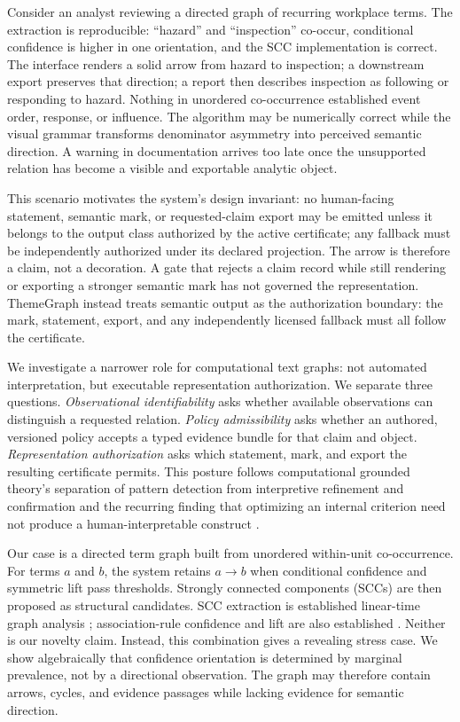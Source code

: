 \documentclass[manuscript,screen,review]{acmart}
\begin{document}
Consider an analyst reviewing a directed graph of recurring workplace terms. The extraction is reproducible: ``hazard'' and ``inspection'' co-occur, conditional confidence is higher in one orientation, and the SCC implementation is correct. The interface renders a solid arrow from hazard to inspection; a downstream export preserves that direction; a report then describes inspection as following or responding to hazard. Nothing in unordered co-occurrence established event order, response, or influence. The algorithm may be numerically correct while the visual grammar transforms denominator asymmetry into perceived semantic direction. A warning in documentation arrives too late once the unsupported relation has become a visible and exportable analytic object.

This scenario motivates the system's design invariant: no human-facing statement, semantic mark, or requested-claim export may be emitted unless it belongs to the output class authorized by the active certificate; any fallback must be independently authorized under its declared projection. The arrow is therefore a claim, not a decoration. A gate that rejects a claim record while still rendering or exporting a stronger semantic mark has not governed the representation. ThemeGraph instead treats semantic output as the authorization boundary: the mark, statement, export, and any independently licensed fallback must all follow the certificate.

We investigate a narrower role for computational text graphs: not automated interpretation, but executable representation authorization. We separate three questions. \emph{Observational identifiability} asks whether available observations can distinguish a requested relation. \emph{Policy admissibility} asks whether an authored, versioned policy accepts a typed evidence bundle for that claim and object. \emph{Representation authorization} asks which statement, mark, and export the resulting certificate permits. This posture follows computational grounded theory's separation of pattern detection from interpretive refinement and confirmation \cite{nelson2020} and the recurring finding that optimizing an internal criterion need not produce a human-interpretable construct \cite{chang2009}.

Our case is a directed term graph built from unordered within-unit co-occurrence. For terms $a$ and $b$, the system retains $a\rightarrow b$ when conditional confidence and symmetric lift pass thresholds. Strongly connected components (SCCs) are then proposed as structural candidates. SCC extraction is established linear-time graph analysis \cite{tarjan1972}; association-rule confidence and lift are also established \cite{agrawal1993}. Neither is our novelty claim. Instead, this combination gives a revealing stress case. We show algebraically that confidence orientation is determined by marginal prevalence, not by a directional observation. The graph may therefore contain arrows, cycles, and evidence passages while lacking evidence for semantic direction.
\end{document}
